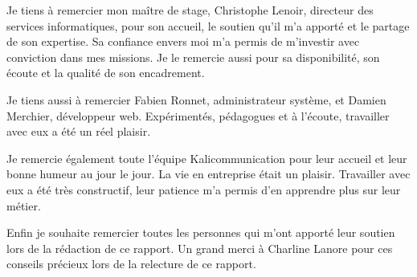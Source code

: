 Je tiens à remercier mon maître de stage, Christophe Lenoir, directeur des services informatiques, pour son accueil, le soutien qu'il m'a apporté et le partage de son expertise. Sa confiance envers moi m'a permis de m'investir avec conviction dans mes missions. Je le remercie aussi pour sa disponibilité, son écoute et la qualité de son encadrement.\newline

Je tiens aussi à remercier Fabien Ronnet, administrateur système, et Damien Merchier, développeur web. Expérimentés, pédagogues et à l'écoute, travailler avec eux a été un réel plaisir.\newline

Je remercie également toute l'équipe Kalicommunication pour leur accueil et leur bonne humeur au jour le jour. La vie en entreprise était un plaisir. Travailler avec eux a été très constructif, leur patience m'a permis d'en apprendre plus sur leur métier.\newline

Enfin je souhaite remercier toutes les personnes qui m'ont apporté leur soutien lors de la rédaction de ce rapport. Un grand merci à Charline Lanore pour ces conseils précieux lors de la relecture de ce rapport.